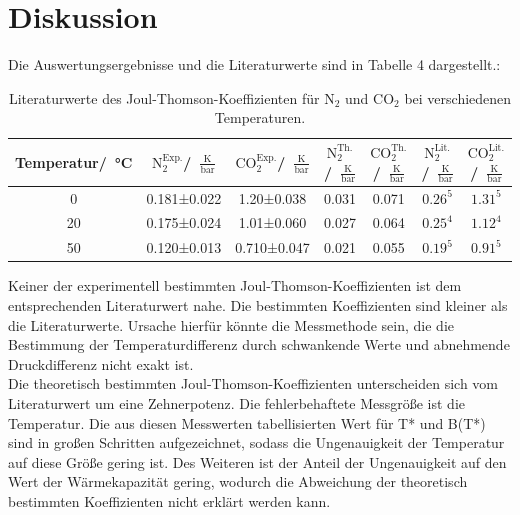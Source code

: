 \documentclass[a4paper,12pt,oneside,onecolum,final,openany]{report}
\begin{document}
\chapter{Diskussion}
Die Auswertungsergebnisse und die Literaturwerte sind in Tabelle 4 dargestellt.:
\begin{table}[h]
\centering
\caption{Literaturwerte des Joul-Thomson-Koeffizienten für $\text{N}_2$ und $\text{CO}_2$ bei verschiedenen Temperaturen.}
\begin{scriptsize}
\begin{tabular}{c|c|c|c|c|c|c}
Temperatur/~°C&$\text{N}_2^{\text{Exp.}}$/~$\frac{\text{K}}{\text{bar}}$&$\text{CO}_2^{\text{Exp.}}$/~$\frac{\text{K}}{\text{bar}}$&$\text{N}_2^{\text{Th.}}$/~$\frac{\text{K}}{\text{bar}}$&$\text{CO}_2^{\text{Th.}}$/~$\frac{\text{K}}{\text{bar}}$&$\text{N}_2^{\text{Lit.}}$/~$\frac{\text{K}}{\text{bar}}$&$\text{CO}_2^{\text{Lit.}}$/~$\frac{\text{K}}{\text{bar}}$\\
\hline
0 &0.181±0.022&1.20±0.038&0.031&0.071&$0.26^{5}$ & $1.31^{5}$\\
\hline
20 &0.175±0.024&1.01±0.060&0.027&0.064&$0.25^{4}$& $1.12^{4}$\\
\hline
50&0.120±0.013 &0.710±0.047&0.021&0.055&$0.19^{5}$ &$0.91^{5}$\\
\end{tabular}
\end{scriptsize}
\end{table}
\noindent
Keiner der experimentell bestimmten Joul-Thomson-Koeffizienten ist dem entsprechenden Literaturwert nahe. Die bestimmten Koeffizienten sind kleiner als die Literaturwerte. Ursache hierfür könnte die Messmethode sein, die die Bestimmung der Temperaturdifferenz durch schwankende Werte und abnehmende Druckdifferenz nicht exakt ist.\\
Die theoretisch bestimmten Joul-Thomson-Koeffizienten unterscheiden sich vom Literaturwert um eine Zehnerpotenz. Die fehlerbehaftete Messgröße ist die Temperatur. Die aus diesen Messwerten tabellisierten Wert für T* und B(T*) sind in großen Schritten aufgezeichnet, sodass die Ungenauigkeit der Temperatur auf diese Größe gering ist. Des Weiteren ist der Anteil der Ungenauigkeit auf den Wert der Wärmekapazität gering, wodurch die Abweichung der theoretisch bestimmten Koeffizienten nicht erklärt werden kann.\\
\end{document}
